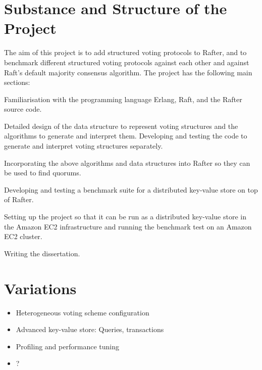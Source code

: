 \documentclass[12pt]{scrartcl}
\begin{document}
\section{Substance and Structure of the Project%
  \label{substance-and-structure-of-the-project}%
}

The aim of this project is to add structured voting protocols to Rafter, and to benchmark different structured voting protocols against each other and against Raft's default majority consensus algorithm. The project has the following main sections:
\begin{list}{.}
{
\setlength{\rightmargin}{\leftmargin}
}

\item Familiarisation with the programming language Erlang, Raft, and the Rafter source code.

\item Detailed design of the data structure to represent voting structures and the algorithms to generate and interpret them. Developing and testing the code to generate and interpret voting structures separately.

\item Incorporating the above algorithms and data structures into Rafter so they can be used to find quorums.

\item Developing and testing a benchmark suite for a distributed key-value store on top of Rafter.

\item Setting up the project so that it can be run as a distributed key-value store in the Amazon EC2 infrastructure and running the benchmark test on an Amazon EC2 cluster.

\item Writing the dissertation.
\end{list}


\section{Variations%
  \label{variations}%
}
%
\begin{itemize}

\item Heterogeneous voting scheme configuration

\item Advanced key-value store: Queries, transactions

\item Profiling and performance tuning

\item ?

\end{itemize}
\end{document}
